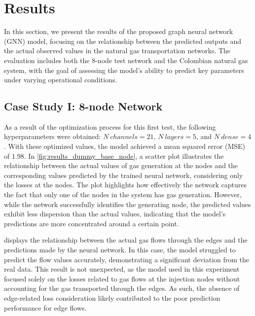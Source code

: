 \section{Results}

In this section, we present the results of the proposed graph neural network (GNN) model, focusing on the relationship between the predicted outputs and the actual observed values in the natural gas transportation networks. The evaluation includes both the 8-node test network and the Colombian natural gas system, with the goal of assessing the model's ability to predict key parameters under varying operational conditions. 


%
%     
%

\subsection{Case Study I: 8-node Network}


As a result of the optimization process for this first test, the following hyperparameters were obtained: $N \ channels=21$, $N \ layers=5$, and $N \ dense=4$. With these optimized values, the model achieved a mean squared error (MSE) of 1.98. In \cref{fig:results_dummy_base_node}, a scatter plot illustrates the relationship between the actual values of gas generation at the nodes and the corresponding values predicted by the trained neural network, considering only the losses at the nodes. The plot highlights how effectively the network captures the fact that only one of the nodes in the system has gas generation. However, while the network successfully identifies the generating node, the predicted values exhibit less dispersion than the actual values, indicating that the model's predictions are more concentrated around a certain point.


 displays the relationship between the actual gas flows through the edges and the predictions made by the neural network. In this case, the model struggled to predict the flow values accurately, demonstrating a significant deviation from the real data. This result is not unexpected, as the model used in this experiment focused solely on the losses related to gas flows at the injection nodes without accounting for the gas transported through the edges. As such, the absence of edge-related loss consideration likely contributed to the poor prediction performance for edge flows.


